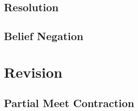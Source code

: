 \documentclass[a4paper,10pt]{article}
\begin{document}
\subsection{Resolution}
\label{subsec:resolution}


\subsection{Belief Negation}
\label{subsec:negation}


\section{Revision}
\label{sec:revision}


\subsection{Partial Meet Contraction}
\label{subsec:contraction}



\end{document}
